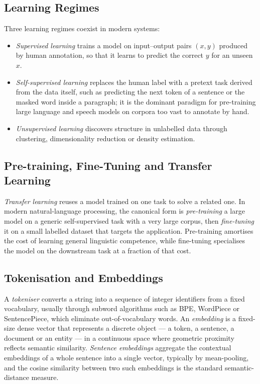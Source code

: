 \subsection{Learning Regimes}
Three learning regimes coexist in modern systems:
\begin{itemize}
    \item \emph{Supervised learning} trains a model on input--output
        pairs $(x, y)$ produced by human annotation, so that it learns
        to predict the correct $y$ for an unseen $x$.
    \item \emph{Self-supervised learning} replaces the human label
        with a pretext task derived from the data itself, such as
        predicting the next token of a sentence or the masked word
        inside a paragraph; it is the dominant paradigm for
        pre-training large language and speech models on corpora too
        vast to annotate by hand.
    \item \emph{Unsupervised learning} discovers structure in
        unlabelled data through clustering, dimensionality reduction
        or density estimation.
\end{itemize}

\subsection{Pre-training, Fine-Tuning and Transfer Learning}
\emph{Transfer learning} reuses a model trained on one task to solve a
related one. In modern natural-language processing, the canonical form
is \emph{pre-training} a large model on a generic self-supervised task
with a very large corpus, then \emph{fine-tuning} it on a small
labelled dataset that targets the application. Pre-training amortises
the cost of learning general linguistic competence, while fine-tuning
specialises the model on the downstream task at a fraction of that
cost.

\subsection{Tokenisation and Embeddings}
A \emph{tokeniser} converts a string into a sequence of integer
identifiers from a fixed vocabulary, usually through subword algorithms
such as \acs{BPE}, WordPiece or SentencePiece, which eliminate
out-of-vocabulary words. An \emph{embedding} is a fixed-size dense
vector that represents a discrete object --- a token, a sentence, a
document or an entity --- in a continuous space where geometric
proximity reflects semantic similarity. \emph{Sentence embeddings}
aggregate the contextual embeddings of a whole sentence into a single
vector, typically by mean-pooling, and the cosine similarity between
two such embeddings is the standard semantic-distance measure.

